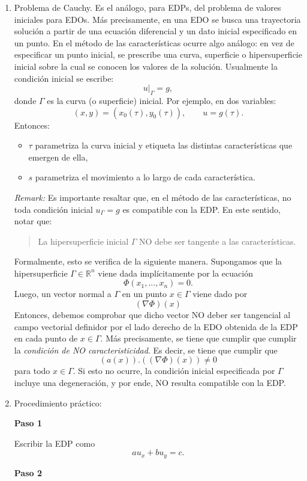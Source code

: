 \documentclass[11pt,spanish]{article}
\newcounter{problema}
\begin{document}
\begin{enumerate}
\item Problema de Cauchy.
Es el análogo, para EDPs, del problema de valores iniciales para EDOs.
Más precisamente, en una EDO se busca una trayectoria solución a partir de una ecuación diferencial y un dato inicial especificado en un punto.
En el método de las características ocurre algo análogo: en vez de especificar un punto inicial, se prescribe una curva, superficie o hipersuperficie inicial sobre la cual se conocen los valores de la solución.
Usualmente la condición inicial se escribe:
$$
u|_{\Gamma}=g,
$$
donde $\Gamma$ es la curva (o superficie) inicial.
Por ejemplo, en dos variables:
$$
(x,y)=(x_0(\tau),y_0(\tau)),
\qquad
u=g(\tau).
$$
Entonces:
\begin{itemize}
\item $\tau$ parametriza la curva inicial y etiqueta las distintas características que emergen de ella,
\item $s$ parametriza el movimiento a lo largo de cada característica.
\end{itemize}

{\em Remark:}
Es importante resaltar que, en el m\'etodo de las caracter\'isticas, no toda condici\'on inicial $u_{\Gamma}=g$ es compatible con la EDP.
En este sentido, notar que:
\begin{quotation}
La hipersuperficie inicial $\Gamma$ NO debe ser tangente a las caracter\'isticas.
\end{quotation}
Formalmente, esto se verifica de la siguiente manera.
Supongamos que la hipersuperficie $\Gamma\in \mathbb{R}^n$ viene dada impl\'icitamente por la ecuaci\'on
$$
\Phi(x_1,...,x_n)=0.
$$
Luego, un vector normal a $\Gamma$ en un punto $x\in \Gamma$ viene dado por
$$
(\nabla \Phi)(x)
$$
Entonces, debemos comprobar que dicho vector NO deber ser tangencial al campo vectorial definidor por el lado derecho de la EDO obtenida de la EDP en cada punto de $x\in \Gamma$.
M\'as precisamente, se tiene que cumplir que cumplir la {\em condici\'on de NO caracteristicidad}. 
Es decir, se tiene que cumplir que
$$
(a(x)).((\nabla \Phi)(x)) \neq 0
$$
para todo $x\in \Gamma$.
Si esto no ocurre, la condici\'on inicial especificada por $\Gamma$ incluye una degeneraci\'on, y por ende, NO resulta compatible con la EDP.

\item Procedimiento práctico:

{\bf  Paso 1}

Escribir la EDP como
$$
a u_x+b u_y=c.
$$

{\bf  Paso 2}


\end{enumerate}
\end{document}
